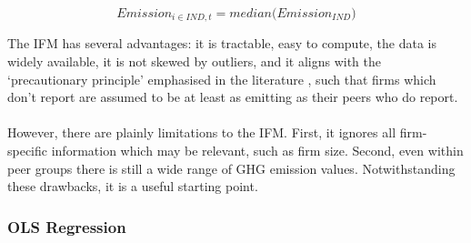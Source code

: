 \documentclass[12pt,twoside]{report}
\begin{document}
\begin{equation}
    \mathit{Emission_{i\in{IND},t}}= \mathit{median}(\mathit{Emission_{IND})}
\end{equation}

The IFM has several advantages: it is tractable, easy to compute, the data is widely available, it is not skewed by outliers, and it aligns with the `precautionary principle' emphasised in the literature \cite{Hoepner2021, olesiewicz2023}, such that firms which don't report are assumed to be at least as emitting as their peers who do report. 
\\\\
However, there are plainly limitations to the IFM. First, it ignores all firm-specific information which may be relevant, such as firm size. Second, even within peer groups there is still a wide range of GHG emission values. Notwithstanding these drawbacks, it is a useful starting point.

\subsubsection{OLS Regression}
\end{document}
